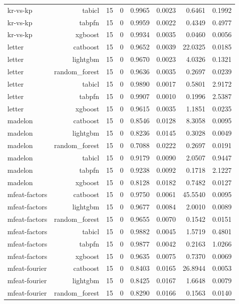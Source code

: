 \begin{table}[htbp]
\begin{tabular}{lrrrrrrr}
kr-vs-kp & tabicl & 15 & 0 & 0.9965 & 0.0023 & 0.6461 & 0.1992 \\
kr-vs-kp & tabpfn & 15 & 0 & 0.9959 & 0.0022 & 0.4349 & 0.4977 \\
kr-vs-kp & xgboost & 15 & 0 & 0.9934 & 0.0035 & 0.0460 & 0.0056 \\
letter & catboost & 15 & 0 & 0.9652 & 0.0039 & 22.0325 & 0.0185 \\
letter & lightgbm & 15 & 0 & 0.9670 & 0.0023 & 4.0326 & 0.1321 \\
letter & random\_forest & 15 & 0 & 0.9636 & 0.0035 & 0.2697 & 0.0239 \\
letter & tabicl & 15 & 0 & 0.9890 & 0.0017 & 0.5801 & 2.9172 \\
letter & tabpfn & 15 & 0 & 0.9907 & 0.0010 & 0.1996 & 2.5387 \\
letter & xgboost & 15 & 0 & 0.9615 & 0.0035 & 1.1851 & 0.0235 \\
madelon & catboost & 15 & 0 & 0.8546 & 0.0128 & 8.3058 & 0.0095 \\
madelon & lightgbm & 15 & 0 & 0.8236 & 0.0145 & 0.3028 & 0.0049 \\
madelon & random\_forest & 15 & 0 & 0.7088 & 0.0222 & 0.2697 & 0.0191 \\
madelon & tabicl & 15 & 0 & 0.9179 & 0.0090 & 2.0507 & 0.9447 \\
madelon & tabpfn & 15 & 0 & 0.9238 & 0.0092 & 0.1718 & 2.1227 \\
madelon & xgboost & 15 & 0 & 0.8128 & 0.0182 & 0.7482 & 0.0127 \\
mfeat-factors & catboost & 15 & 0 & 0.9750 & 0.0061 & 45.5540 & 0.0095 \\
mfeat-factors & lightgbm & 15 & 0 & 0.9677 & 0.0084 & 2.0010 & 0.0089 \\
mfeat-factors & random\_forest & 15 & 0 & 0.9655 & 0.0070 & 0.1542 & 0.0151 \\
mfeat-factors & tabicl & 15 & 0 & 0.9882 & 0.0045 & 1.5719 & 0.4801 \\
mfeat-factors & tabpfn & 15 & 0 & 0.9877 & 0.0042 & 0.2163 & 1.0266 \\
mfeat-factors & xgboost & 15 & 0 & 0.9635 & 0.0075 & 0.7370 & 0.0069 \\
mfeat-fourier & catboost & 15 & 0 & 0.8403 & 0.0165 & 26.8944 & 0.0053 \\
mfeat-fourier & lightgbm & 15 & 0 & 0.8425 & 0.0167 & 1.6648 & 0.0079 \\
mfeat-fourier & random\_forest & 15 & 0 & 0.8290 & 0.0166 & 0.1563 & 0.0140 \\

\end{tabular}
\end{table}
